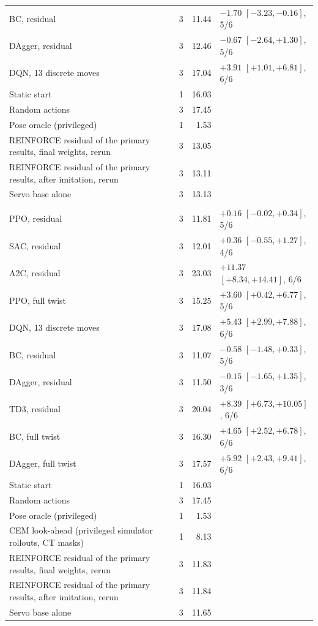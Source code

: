 \begin{table}[tp]
\begin{tabularx}{\textwidth}{@{}>{\raggedright\arraybackslash}X c r l@{}}
\quad BC, residual & 3 & 11.44 & $-1.70$ $[-3.23, -0.16]$, 5/6 \\
\quad DAgger, residual & 3 & 12.46 & $-0.67$ $[-2.64, +1.30]$, 5/6 \\
\quad DQN, 13 discrete moves & 3 & 17.04 & $+3.91$ $[+1.01, +6.81]$, 6/6 \\
\quad Static start & 1 & 16.03 &  \\
\quad Random actions & 3 & 17.45 &  \\
\quad Pose oracle (privileged) & 1 & 1.53 &  \\
\quad REINFORCE residual of the primary results, final weights, rerun & 3 & 13.05 &  \\
\quad REINFORCE residual of the primary results, after imitation, rerun & 3 & 13.11 &  \\
\quad Servo base alone & 3 & 13.13 &  \\
\addlinespace
\multicolumn{4}{@{}l}{\textit{CT masks, physics frames}} \\
\quad PPO, residual & 3 & 11.81 & $+0.16$ $[-0.02, +0.34]$, 5/6 \\
\quad SAC, residual & 3 & 12.01 & $+0.36$ $[-0.55, +1.27]$, 4/6 \\
\quad A2C, residual & 3 & 23.03 & $+11.37$ $[+8.34, +14.41]$, 6/6 \\
\quad PPO, full twist & 3 & 15.25 & $+3.60$ $[+0.42, +6.77]$, 5/6 \\
\quad DQN, 13 discrete moves & 3 & 17.08 & $+5.43$ $[+2.99, +7.88]$, 6/6 \\
\quad BC, residual & 3 & 11.07 & $-0.58$ $[-1.48, +0.33]$, 5/6 \\
\quad DAgger, residual & 3 & 11.50 & $-0.15$ $[-1.65, +1.35]$, 3/6 \\
\quad TD3, residual & 3 & 20.04 & $+8.39$ $[+6.73, +10.05]$, 6/6 \\
\quad BC, full twist & 3 & 16.30 & $+4.65$ $[+2.52, +6.78]$, 6/6 \\
\quad DAgger, full twist & 3 & 17.57 & $+5.92$ $[+2.43, +9.41]$, 6/6 \\
\quad Static start & 1 & 16.03 &  \\
\quad Random actions & 3 & 17.45 &  \\
\quad Pose oracle (privileged) & 1 & 1.53 &  \\
\quad CEM look-ahead (privileged simulator rollouts, CT masks) & 1 & 8.13 &  \\
\quad REINFORCE residual of the primary results, final weights, rerun & 3 & 11.83 &  \\
\quad REINFORCE residual of the primary results, after imitation, rerun & 3 & 11.84 &  \\
\quad Servo base alone & 3 & 11.65 &  \\
\bottomrule
\end{tabularx}
\end{table}
